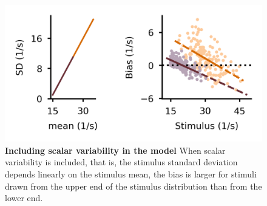 \documentclass[10pt,a4paper,draft]{article}
\begin{document}
\begin{figure}[!h]
	\centering
    \includegraphics{../results/figures/final/Fig_5_S1}%
\caption{\footnotesize{\bf Including scalar variability in the model \newline}  
When scalar variability is included, that is, the stimulus standard deviation depends linearly on the stimulus mean, the bias is larger for stimuli drawn from the upper end of the stimulus distribution than from the lower end. 
}
\label{fig:Fig_5_S1}
\end{figure}
\end{document}
